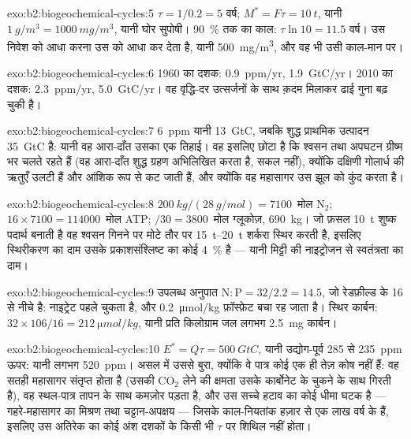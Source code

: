 \begin{solution}{exo:b2:biogeochemical-cycles:5}
$\tau = 1/0.2 = 5$ वर्ष; $M^{*} = F\tau = \qty{10}{t}$, यानी
$\qty{1}{g/m^3} = \qty{1000}{mg/m^3}$, यानी घोर सुपोषी।
\qty{90}{\%} तक का काल: $\tau\ln 10 = 11.5$ वर्ष। उस निवेश को आधा करना
उस  को आधा कर देता है, यानी \qty{500}{mg/m^3}, और वह भी उसी
काल-मान पर।
\end{solution}

\begin{solution}{exo:b2:biogeochemical-cycles:6}
1960 का दशक: \qty{0.9}{ppm/yr}, \qty{1.9}{GtC/yr}। 2010 का दशक: \qty{2.3}{ppm/yr},
\qty{5.0}{GtC/yr}। वह वृद्धि-दर उत्सर्जनों के साथ क़दम मिलाकर ढाई
गुना बढ़ चुकी है।
\end{solution}

\begin{solution}{exo:b2:biogeochemical-cycles:7}
\qty{6}{ppm} यानी \qty{13}{GtC}, जबकि शुद्ध प्राथमिक उत्पादन
\qty{35}{GtC} है: यानी वह आरा-दाँत उसका एक तिहाई। वह इसलिए छोटा है कि
श्वसन तथा अपघटन ग्रीष्म भर चलते रहते हैं (वह
आरा-दाँत शुद्ध ग्रहण अभिलिखित करता है, सकल नहीं), क्योंकि
दक्षिणी गोलार्ध की ऋतुएँ उलटी हैं और आंशिक रूप से कट जाती हैं, और
क्योंकि वह महासागर उस झूल को कुंद करता है।
\end{solution}

\begin{solution}{exo:b2:biogeochemical-cycles:8}
$\qty{200}{kg}/(\qty{28}{g/mol}) = 7100$~मोल $\mathrm{N_2}$; $16\times
7100 = \num{114000}$~मोल ATP; $/30 = 3800$~मोल ग्लूकोज़, \qty{690}{kg}।
जो फ़सल \qty{10}{t} शुष्क पदार्थ बनाती है वह श्वसन गिनने पर मोटे तौर पर
\qtyrange{15}{20}{t} शर्करा स्थिर करती है, इसलिए
स्थिरीकरण का दाम उसके प्रकाशसंश्लिष्ट का कोई \qty{4}{\%} है --- यानी
मिट्टी की नाइट्रोजन से स्वतंत्रता का दाम।
\end{solution}

\begin{solution}{exo:b2:biogeochemical-cycles:9}
उपलब्ध अनुपात $\mathrm{N:P} = 32/2.2 = 14.5$, जो रेडफ़ील्ड के
16 से नीचे है: नाइट्रेट पहले चुकता है, और \qty{0.2}{\micro mol/kg}
फ़ॉस्फ़ेट बचा रह जाता है। स्थिर कार्बन: $32\times 106/16 =
\qty{212}{\micro mol/kg}$, यानी प्रति किलोग्राम जल लगभग \qty{2.5}{mg}
कार्बन।
\end{solution}

\begin{solution}{exo:b2:biogeochemical-cycles:10}
$E^{*} = Q\tau = \qty{500}{GtC}$, यानी उद्योग-पूर्व 285 से
\qty{235}{ppm} ऊपर: यानी लगभग \qty{520}{ppm}। असल में उससे बुरा, क्योंकि
वे पात्र कोई एक ही तेज़ कोष नहीं हैं: वह सतही महासागर संतृप्त होता है
(उसकी $\mathrm{CO_2}$ लेने की क्षमता उसके कार्बोनेट के चुकने के साथ गिरती है),
वह स्थल-पात्र तापन के साथ कमज़ोर पड़ता है, और उस सच्चे हटाव का कोई
धीमा घटक है --- गहरे-महासागर का मिश्रण तथा चट्टान-अपक्षय --- जिसके
काल-नियतांक हज़ार से एक लाख वर्ष के हैं, इसलिए उस अतिरेक का कोई
अंश दशकों के किसी भी $\tau$ पर शिथिल नहीं होता।
\end{solution}

